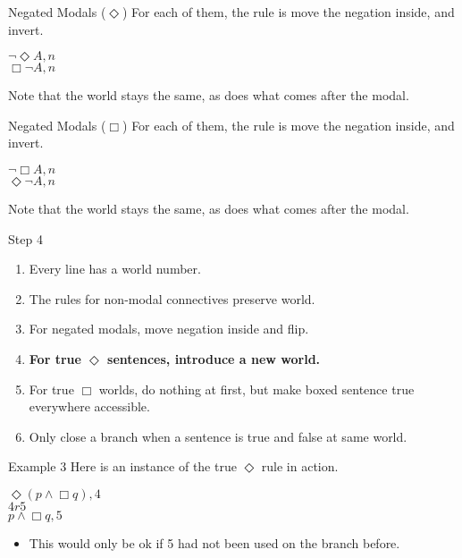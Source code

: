 \documentclass[
  14pt,
  letterpaper,
  ignorenonframetext,
  aspectratio=169,
]{beamer}
\providecommand{\tightlist}{%
  \setlength{\itemsep}{0pt}\setlength{\parskip}{0pt}}\usepackage{longtable,booktabs,array}
\begin{document}
\begin{frame}{Negated Modals (\(\Diamond\))}
\protect\hypertarget{negated-modals-diamond}{}
For each of them, the rule is move the negation inside, and invert.

\begin{center}
$\neg \Diamond A, n$ \\
$\Box \neg A, n$
\end{center}

Note that the world stays the same, as does what comes after the modal.
\end{frame}

\begin{frame}{Negated Modals (\(\Box\))}
\protect\hypertarget{negated-modals-box}{}
For each of them, the rule is move the negation inside, and invert.

\begin{center}
$\neg \Box A, n$ \\
$\Diamond \neg A, n$
\end{center}

Note that the world stays the same, as does what comes after the modal.
\end{frame}

\begin{frame}{Step 4}
\protect\hypertarget{step-4}{}
\begin{enumerate}
\tightlist
\item
  Every line has a world number.
\item
  The rules for non-modal connectives preserve world.
\item
  For negated modals, move negation inside and flip.
\item
  \textbf{For true \(\Diamond\) sentences, introduce a new world.}
\item
  For true \(\Box\) worlds, do nothing at first, but make boxed sentence
  true everywhere accessible.
\item
  Only close a branch when a sentence is true and false at same world.
\end{enumerate}
\end{frame}

\begin{frame}{Example 3}
\protect\hypertarget{example-3}{}
Here is an instance of the true \(\Diamond\) rule in action.

\begin{center}
$\Diamond(p \wedge \Box q), 4$ \\
$4r5$ \\
$p \wedge \Box q, 5$
\end{center}

\begin{itemize}
\tightlist
\item
  This would only be ok if 5 had not been used on the branch before.
\end{itemize}
\end{frame}
\end{document}
